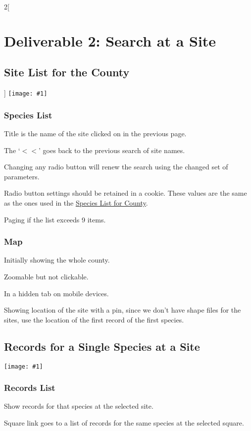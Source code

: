 \documentclass[a4paper,12pt,landscape]{article}
\newcommand{\wireframe}[1]{\texttt{[image: \#1]}\clearpage}
\begin{document}
\begin{multicols*}{2}[%
  \section{Deliverable 2: Search at a Site}%
  \subsection{Site List for the County}%
]
\wireframe{./wireframes/Species__ListForSite.png}%

\subsubsection*{Species List} 

\begin{todolist}
  \item Title is the name of the site clicked on in the previous page.
  \item The `$<<$' goes back to the previous search of site names.
  \item Changing any radio button will renew the search using the changed set of parameters.
  \item Radio button settings should be retained in a cookie.
    These values are the same as the ones used in the \hyperref[sec:species-list-for-county]{Species List for County}.
  \item Paging if the list exceeds 9 items.
\end{todolist}

\subsubsection*{Map}

\begin{todolist}
  \item Initially showing the whole county.
  \item Zoomable but not clickable.
  \item In a hidden tab on mobile devices.
  \item Showing location of the site with a pin, since we don't have shape files for the sites,
   use the location of the first record of the first species.
\end{todolist}

\clearpage

\subsection{Records for a Single Species at a Site}

\wireframe{./wireframes/Records__SingleSpeciesForSite.png}%

\subsubsection*{Records List} 

\begin{todolist}
  \item Show records for that species at the selected site.
  \item Square link goes to a list of records for the same species at the selected square.
\end{todolist}


\end{multicols*}
\end{document}
